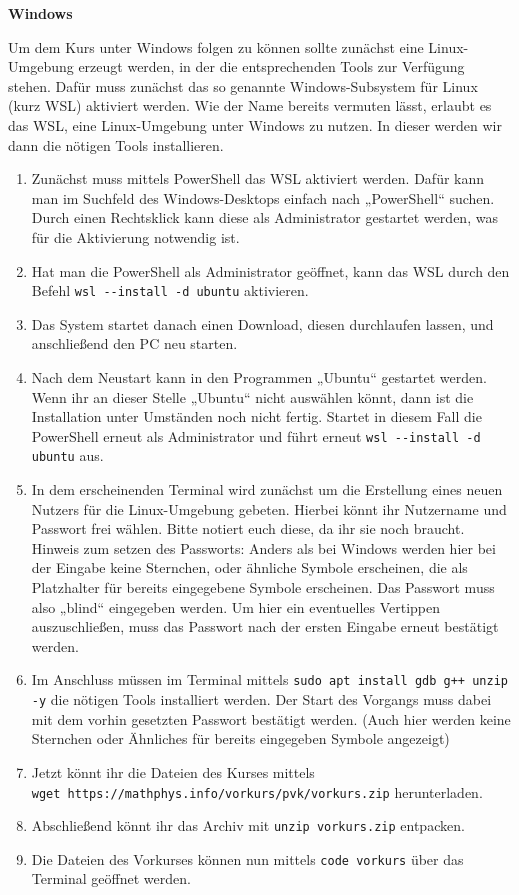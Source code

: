 \textbf{Windows}

\pagestyle{empty}
Um dem Kurs unter Windows folgen zu können sollte zunächst eine Linux-Umgebung erzeugt werden, in der die entsprechenden Tools zur Verfügung stehen. Dafür muss zunächst das so genannte Windows-Subsystem für Linux (kurz WSL) aktiviert werden.
Wie der Name bereits vermuten lässt, erlaubt es das WSL, eine Linux-Umgebung unter Windows zu nutzen.
In dieser werden wir dann die nötigen Tools installieren.
\begin{enumerate}
	\item Zunächst muss mittels PowerShell das WSL aktiviert werden. Dafür kann man im Suchfeld des Windows-Desktops einfach nach „PowerShell“ suchen.
	Durch einen Rechtsklick kann diese als Administrator gestartet werden, was für die Aktivierung notwendig ist.
	\item Hat man die PowerShell als Administrator geöffnet, kann das WSL durch den Befehl \texttt{wsl -{}-install -d ubuntu} aktivieren.
	\item Das System startet danach einen Download, diesen durchlaufen lassen, und anschließend den PC neu starten.
	\item Nach dem Neustart kann in den Programmen „Ubuntu“ gestartet werden. 
		Wenn ihr an dieser Stelle „Ubuntu“ nicht auswählen könnt, dann ist die Installation unter Umständen noch nicht fertig.
		Startet in diesem Fall die PowerShell erneut als Administrator und führt erneut \texttt{wsl -{}-install -d ubuntu} aus.
	\item In dem erscheinenden Terminal wird zunächst um die Erstellung eines neuen Nutzers für die Linux-Umgebung gebeten. 
		Hierbei könnt ihr Nutzername und Passwort frei wählen. Bitte notiert euch diese, da ihr sie noch braucht.\\
		Hinweis zum setzen des Passworts: Anders als bei Windows werden hier bei der Eingabe keine Sternchen, oder ähnliche Symbole erscheinen, die als Platzhalter für bereits eingegebene Symbole erscheinen. 
		Das Passwort muss also „blind“ eingegeben werden. Um hier ein eventuelles Vertippen auszuschließen, muss das Passwort nach der ersten Eingabe erneut bestätigt werden.
	\item Im Anschluss müssen im Terminal mittels \texttt{sudo apt install gdb g++ unzip -y} die nötigen Tools installiert werden. 
		Der Start des Vorgangs muss dabei mit dem vorhin gesetzten Passwort bestätigt werden. 
		(Auch hier werden keine Sternchen oder Ähnliches für bereits eingegeben Symbole angezeigt)
	\item Jetzt könnt ihr die Dateien des Kurses mittels \\
		\texttt{wget https://mathphys.info/vorkurs/pvk/vorkurs.zip} herunterladen.
	\item Abschließend könnt ihr das Archiv mit \texttt{unzip vorkurs.zip} entpacken.
	\item Die Dateien des Vorkurses können nun mittels \texttt{code vorkurs} über das Terminal geöffnet werden.
\end{enumerate}